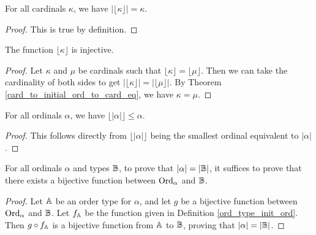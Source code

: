 \documentclass[../../math.tex]{subfiles}
\begin{document}
\begin{theorem} \label{card_to_initial_ord_to_card_eq}
    For all cardinals $\kappa$, we have $|\lfloor \kappa \rfloor| = \kappa$.
\end{theorem}
\begin{proof}
    This is true by definition.
\end{proof}

\begin{instance}
    The function $\lfloor \kappa \rfloor$ is injective.
\end{instance}
\begin{proof}
    Let $\kappa$ and $\mu$ be cardinals such that $\lfloor \kappa \rfloor =
    \lfloor \mu \rfloor$.  Then we can take the cardinality of both sides to get
    $|\lfloor \kappa \rfloor| = |\lfloor \mu \rfloor|$.  By Theorem
    \ref{card_to_initial_ord_to_card_eq}, we have $\kappa = \mu$.
\end{proof}

\begin{theorem} \label{ord_to_card_to_initial_ord_le}
    For all ordinals $\alpha$, we have $\lfloor|\alpha|\rfloor \leq \alpha$.
\end{theorem}
\begin{proof}
    This follows directly from $\lfloor|\alpha|\rfloor$ being the smallest
    ordinal equivalent to $|\alpha|$.
\end{proof}

\begin{theorem} \label{ord_to_card_eq} \label{ord_to_card_eq1}
    \label{ord_to_card_eq2}
    For all ordinals $\alpha$ and types $\mathbb{B}$, to prove that $|\alpha| = |\mathbb{B}|$,
    it suffices to prove that there exists a bijective function between
    $\operatorname{Ord}_\alpha$ and $\mathbb{B}$.
\end{theorem}
\begin{proof}
    Let $\mathbb{A}$ be an order type for $\alpha$, and let $g$ be a bijective function
    between $\operatorname{Ord}_\alpha$ and $\mathbb{B}$.  Let $f_{\mathbb{A}}$ be the function given in
    Definition \ref{ord_type_init_ord}.  Then $g \circ f_{\mathbb{A}}$ is a bijective
    function from $\mathbb{A}$ to $\mathbb{B}$, proving that $|\alpha| = |\mathbb{B}|$.
\end{proof}
\end{document}
